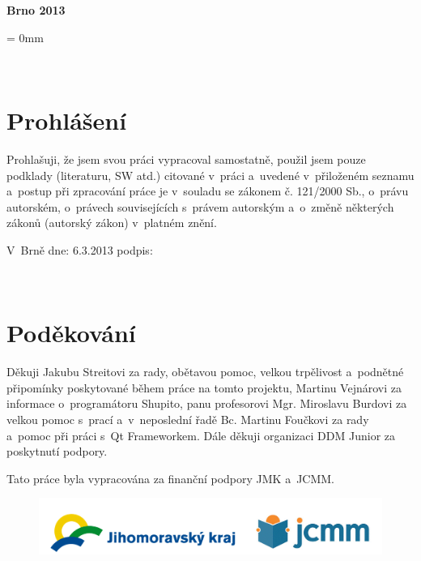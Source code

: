 \documentclass[12pt, a4paper, oneside]{article}
\newcommand{\D}{\medskip \noindent} %
\newcommand{\B}{\textbf} %
\begin{document}
\vspace{20mm}

\begin{center}
\B{Brno 2013}

\end{center}
\normalsize
\newpage  %
\voffset = 0mm %

~ %

\vspace{10mm}

\section*{Prohlášení}

Prohlašuji, že jsem svou práci vypracoval samostatně, použil jsem pouze podklady (literaturu, SW atd.) citované v~práci a~uvedené v~přiloženém seznamu a~postup při zpracování práce je v~souladu se zákonem č. 121/2000 Sb., o~právu autorském, o~právech souvisejících s~právem autorským a~o~změně některých zákonů (autorský zákon) v~platném znění. 
 
\vspace{20mm} 
 
\noindent V~Brně  dne: 6.3.2013 \hspace{50mm}                 podpis:   
 

\newpage   %

~ %
\vspace{100mm}

\section*{Poděkování}
Děkuji Jakubu Streitovi za rady, obětavou pomoc, velkou trpělivost a~podnětné připomínky poskytované během práce na tomto projektu, Martinu Vejnárovi za informace o~programátoru Shupito, panu profesorovi Mgr. Miroslavu Burdovi za velkou pomoc s~prací a~v~neposlední řadě Bc. Martinu Foučkovi za rady a~pomoc při práci s~Qt Frameworkem. Dále děkuji organizaci DDM Junior za poskytnutí podpory.

\D Tato práce byla vypracována za finanční podpory JMK a~JCMM.

\begin{figure}[H]
\begin{center}
\includegraphics[width=\textwidth]{img/jcmm.png}
\end{center}
\end{figure}
 
\end{document}
